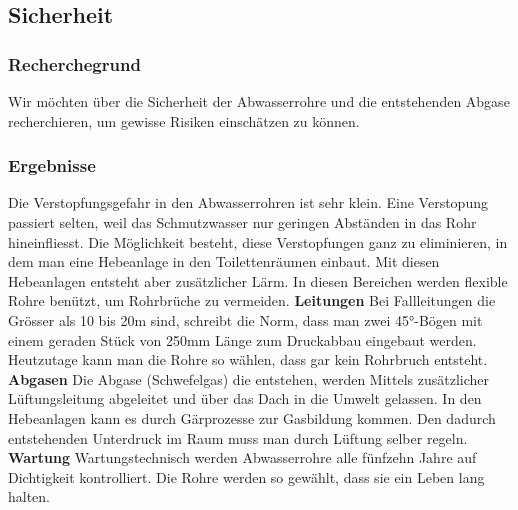 \subsection{Sicherheit}


\subsubsection{Recherchegrund}
Wir möchten über die Sicherheit der Abwasserrohre und die entstehenden Abgase recherchieren, um gewisse Risiken einschätzen zu können. 
\subsubsection{Ergebnisse}
Die Verstopfungsgefahr in den Abwasserrohren ist sehr klein. %
Eine Verstopung passiert selten, weil das Schmutzwasser nur geringen Abständen in das Rohr hineinfliesst. Die Möglichkeit besteht, diese Verstopfungen ganz zu eliminieren, in dem man eine Hebeanlage in den Toilettenräumen einbaut. Mit diesen Hebeanlagen entsteht aber zusätzlicher Lärm. In diesen Bereichen werden flexible Rohre benützt, um Rohrbrüche zu vermeiden.
\newline
\newline
\textbf{Leitungen}
\newline
Bei Fallleitungen die Grösser als 10 bis 20\si{m} sind, schreibt die Norm, dass man zwei 45°-Bögen mit einem geraden Stück von 250\si{mm} Länge zum Druckabbau eingebaut werden. Heutzutage kann man die Rohre so wählen, dass gar kein Rohrbruch entsteht.
\newline
\newline
\textbf{Abgasen}
\newline
Die Abgase (Schwefelgas) die entstehen, werden Mittels zusätzlicher Lüftungsleitung abgeleitet und über das Dach in die Umwelt gelassen. In den Hebeanlagen kann es durch Gärprozesse zur Gasbildung kommen. Den dadurch entstehenden Unterdruck im Raum muss man durch Lüftung selber regeln. 
\newline
\newline
\textbf{Wartung}
\newline
Wartungstechnisch werden Abwasserrohre alle fünfzehn Jahre auf Dichtigkeit kontrolliert. Die Rohre werden so gewählt, dass sie ein Leben lang halten.

